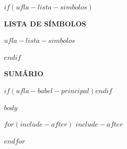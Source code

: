 \documentclass[12pt, a4paper, $if(frente-verso)$twoside$else$oneside$endif$]{book}
\makeatletter
\newlength{\widthsec}
\newlength{\auxwidthsec}
\newcommand{\testasecao}{%
  \ifthenelse{\value{chapter}>0}{\addtolength{\auxwidthsec}{\widthof{\arabic{chapter}}}}{}%
  \ifthenelse{\value{section}>0}{\addtolength{\auxwidthsec}{\widthof{.\arabic{section}}}}{}%
  \ifthenelse{\value{subsection}>0}{\addtolength{\auxwidthsec}{\widthof{.\arabic{subsection}}}}{}%
  \ifthenelse{\value{subsubsection}>0}{\addtolength{\auxwidthsec}{\widthof{.\arabic{subsubsection}}}}{}%
  \setlength{\auxwidthsec}{\maxof{\auxwidthsec}{\widthsec}}%
  \global\widthsec=\auxwidthsec%
}
\renewcommand{\tableofcontents}{
  \newpage
  \begin{center}\textbf{SUMÁRIO}\end{center}
  \normalfont\normalsize\@starttoc{toc}
  \setcounter{tocdepth}{6}
  \clearpage
}
\newcounter{anexo}
\newcounter{uflaartigo}
\newcommand\uflaArtigo[3]{%
  \clearpage
  \stepcounter{uflaartigo}%
  \phantomsection\label{#1}%
  \addcontentsline{toc}{chapter}{\numberline{}#2}%
  \addtocontents{toc}{\protect\setcounter{tocdepth}{0}}%
  \begin{center}\bfseries #2#3\end{center}%
  \setcounter{section}{0}%
  \renewcommand\thesection{\arabic{section}}%
  \renewcommand\theHsection{artigo\arabic{uflaartigo}.\arabic{section}}%
  \titleformat{\section}{\normalfont\normalsize\bfseries}{\thesection}{1ex}%
    {\MakeUppercase}[\testasecao]}
\newenvironment{uflaLista}
 {\begin{list}{}{%
   \setlength{\labelwidth}{3cm}%
   \setlength{\labelsep}{0.5cm}%
   \setlength{\leftmargin}{3.5cm}%
   \setlength{\itemsep}{0pt}%
   \setlength{\parsep}{0pt}%
   \setlength{\topsep}{0pt}%
   \renewcommand{\makelabel}[1]{##1\hfil}}}
 {\end{list}}
\makeatother
\begin{document}
$if(ufla-lista-simbolos)$
\newpage
\begin{center}\textbf{LISTA DE SÍMBOLOS}\end{center}
\begin{uflaLista}
$ufla-lista-simbolos$
\end{uflaLista}
\clearpage
$endif$

\tableofcontents
$if(ufla-babel-principal)$$endif$

\pagestyle{ufla}

$body$



$for(include-after)$
$include-after$

$endfor$
\end{document}
